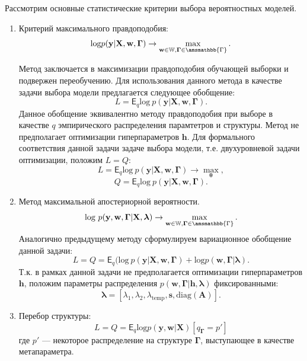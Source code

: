 Рассмотрим основные статистические критерии выбора вероятностных моделей. 
\begin{enumerate}
\item Критерий максимального правдоподобия:
\[\text{log}p(\mathbf{y}|\mathbf{X},\mathbf{w}, \boldsymbol{\Gamma})\to \max_{\mathbf{w}\in \mathbb{W}, \boldsymbol{\Gamma}\in \amsmathbb{\Gamma}}.\]

Метод заключается в максимизации правдоподобия обучающей выборки и подвержен переобучению.
Для использования данного метода в качестве задачи выбора модели предлагается следующее обобщение:
\begin{equation}
\label{eq:optim_ml}
    L =  \mathsf{E}_q \text{log}~p(\mathbf{y}|\mathbf{X}, \mathbf{w}, \boldsymbol{\Gamma}).
\end{equation}
Данное обобщение эквивалентно  методу правдоподобия при выборе в качестве $q$ эмпирического распределения парамтетров и структуры.
Метод не предполагает оптимизации гиперпараметров $\mathbf{h}$. Для формального соответствия данной задачи задаче выбора модели, т.е. двухуровневой задачи оптимизации, положим $L=Q:$
\[
    L =  \mathsf{E}_q \text{log}~p(\mathbf{y}|\mathbf{X}, \mathbf{w}, \boldsymbol{\Gamma}) \to \max_{\boldsymbol{\theta}},
\]
\[
    Q =  \mathsf{E}_q \text{log}~p(\mathbf{y}|\mathbf{X}, \mathbf{w}, \boldsymbol{\Gamma}).
\]



\item Метод максимальной апостериорной вероятности. 
\[\text{log}~p(\mathbf{y},\mathbf{w},\boldsymbol{\Gamma}|\mathbf{X}, \boldsymbol{\lambda} )\to \max_{\mathbf{w} \in \mathbb{W}, \boldsymbol{\Gamma}\in \amsmathbb{\Gamma}}.\]
Аналогично предыдущему методу сформулируем вариационное обобщение данной задачи:
\begin{equation}
\label{eq:optim_map}
L=Q =\mathsf{E}_q\bigl(\text{log}~p(\mathbf{y}|\mathbf{X}, \mathbf{w},\boldsymbol{\Gamma})+\text{log}p(\mathbf{w}, \boldsymbol{\Gamma}|\boldsymbol{\lambda}).
\end{equation}
Т.к. в рамках данной задачи не предполагается оптимизации гиперпараметров $\mathbf{h}$, положим параметры распределения $p(\mathbf{w}, \boldsymbol{\Gamma}|\mathbf{h}, \boldsymbol{\lambda})$ фиксированными:
\[
    \boldsymbol{\lambda} = [\lambda_1, \lambda_2, \lambda_{\text{temp}}, \mathbf{s}, \text{diag}(\mathbf{A})].
\]

\item Перебор структуры:
\begin{equation}
\label{eq:optim_struct}
    L =  Q = \mathsf{E}_q\text{log}p(\mathbf{y}, \mathbf{w}|\mathbf{X})[q_{\boldsymbol{\Gamma}} = p']
\end{equation}
где $p'$ --- некоторое распределение на структуре $\boldsymbol{\Gamma}$, выступающее в качестве метапараметра.





\end{enumerate}
